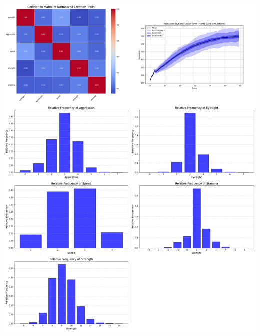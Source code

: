 \documentclass{article}
\begin{document}
\begin{center}
    \includegraphics[scale=0.21]{tests/1.8.jpg}
\end{center}
\end{document}
